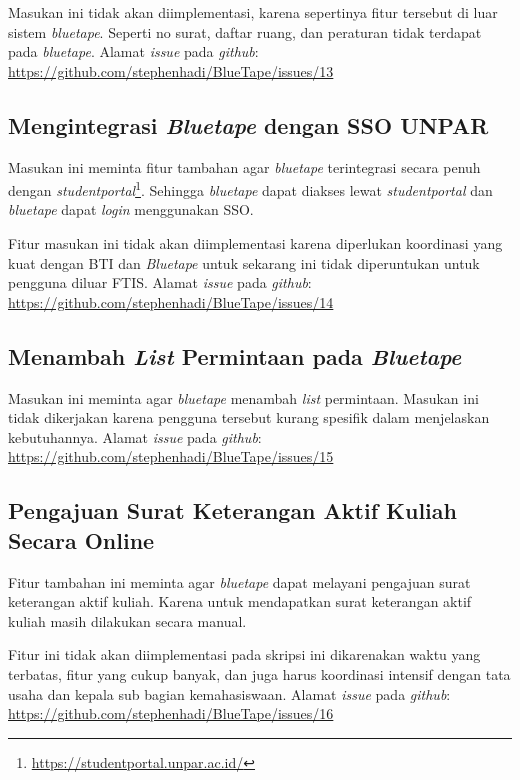 Masukan ini tidak akan diimplementasi, karena sepertinya fitur tersebut di luar sistem \textit{bluetape}. Seperti no surat, daftar ruang, dan peraturan tidak terdapat pada \textit{bluetape}. Alamat \textit{issue} pada \textit{github}: \url{https://github.com/stephenhadi/BlueTape/issues/13} 

\subsection{Mengintegrasi \textit{Bluetape} dengan SSO UNPAR}
\label{issue:14}
Masukan ini meminta fitur tambahan agar \textit{bluetape} terintegrasi secara penuh dengan \textit{studentportal}\footnote{\url{https://studentportal.unpar.ac.id/}}. Sehingga \textit{bluetape} dapat diakses lewat \textit{studentportal} dan \textit{bluetape} dapat \textit{login} menggunakan SSO.

Fitur masukan ini tidak akan diimplementasi karena diperlukan koordinasi yang kuat dengan BTI dan \textit{Bluetape} untuk sekarang ini tidak diperuntukan untuk pengguna diluar FTIS. Alamat \textit{issue} pada \textit{github}: \url{https://github.com/stephenhadi/BlueTape/issues/14} 

\subsection{Menambah \textit{List} Permintaan pada \textit{Bluetape}}
\label{issue:15}
Masukan ini meminta agar \textit{bluetape} menambah \textit{list} permintaan. Masukan ini tidak dikerjakan karena pengguna tersebut kurang spesifik dalam menjelaskan kebutuhannya. Alamat \textit{issue} pada \textit{github}: \url{https://github.com/stephenhadi/BlueTape/issues/15} 

\subsection{Pengajuan Surat Keterangan Aktif Kuliah Secara Online}
\label{issue:16}
Fitur tambahan ini meminta agar \textit{bluetape} dapat melayani pengajuan surat keterangan aktif kuliah. Karena untuk mendapatkan surat keterangan aktif kuliah masih dilakukan secara manual.

Fitur ini tidak akan diimplementasi pada skripsi ini dikarenakan waktu yang terbatas, fitur yang cukup banyak, dan juga harus koordinasi intensif dengan tata usaha dan kepala sub bagian kemahasiswaan. Alamat \textit{issue} pada \textit{github}: \url{https://github.com/stephenhadi/BlueTape/issues/16} 

